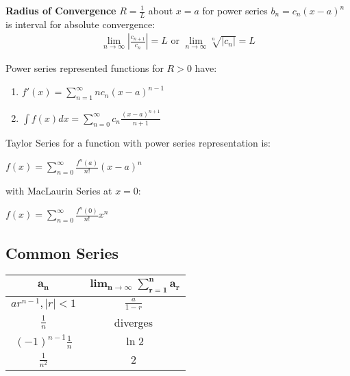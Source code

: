 \documentclass[12pt, a4paper]{article}
\begin{document}
\begin{multicols*}{3}
\textbf{Radius of Convergence} $R=\frac{1}{L}$ about $x=a$ for power series $b_n = c_n(x-a)^n$ is interval for absolute convergence:\vspace{-0.5em}
\begin{align*}
  \displaystyle \lim_{n\rightarrow\infty}\left|\frac{c_{n+1}}{c_n}\right| = L\text{ or }\lim_{n\rightarrow\infty}\sqrt[n]{|c_n|}=L
\end{align*}
\colbreak

Power series represented functions for $R > 0$ have:
\begin{enumerate}[label=\roman*., parsep=-1em]
  \item $\displaystyle f'(x) = \sum^{\infty}_{n=1}nc_n(x-a)^{n-1}$
  \item $\displaystyle \int f(x)dx = \sum^{\infty}_{n=0}c_n\frac{(x-a)^{n+1}}{n+1}$
\end{enumerate}

Taylor Series for a function with power series representation is:\\
{\centering
  $\displaystyle f(x) = \sum^{\infty}_{n=0}\frac{f^n(a)}{n!}(x-a)^n$
\par}
\vspace{-0.5em}
with MacLaurin Series at $x=0$:\\
{\centering
  $\displaystyle f(x) = \sum^{\infty}_{n=0}\frac{f^n(0)}{n!}x^n$
\par}

\subsection{Common Series}
{\centering
\setlength{\extrarowheight}{4pt}
\begin{tabular}{|c|c|}
\hline
$\mathbf{a_n}$ & $\mathbf{\lim_{n\rightarrow\infty}\sum^n_{r=1}a_r}$ \\ \hline
$ar^{n-1}, |r|<1$ & $\displaystyle\frac{a}{1-r}$ \\ \hline
$\displaystyle\frac{1}{n}$ & diverges \\ \hline
$(-1)^{n-1}\displaystyle\frac{1}{n}$ & $\ln 2$ \\ \hline
$\displaystyle\frac{1}{n^2}$ & $2$ \\ \hline
\end{tabular}
\par}


\end{multicols*}
\end{document}
